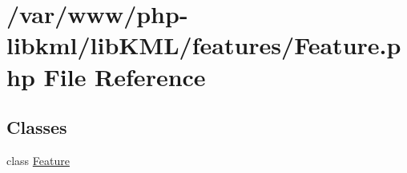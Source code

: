 \hypertarget{Feature_8php}{
\section{/var/www/php-\/libkml/libKML/features/Feature.php File Reference}
\label{d8/d96/Feature_8php}
}
\subsection*{Classes}
\begin{DoxyCompactItemize}
\item 
class \hyperlink{classFeature}{Feature}
\end{DoxyCompactItemize}
